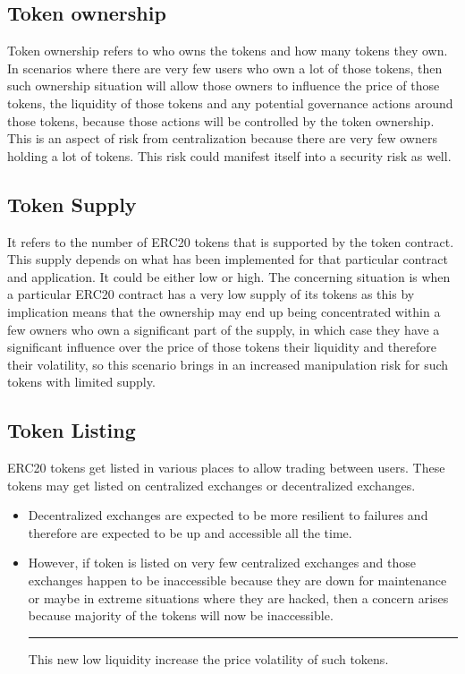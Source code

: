\subsection{Token ownership}\label{token-ownership}

Token ownership refers to who owns the tokens and how many tokens they
own. In scenarios where there are very few users who own a lot of those
tokens, then such ownership situation will allow those owners to
influence the price of those tokens, the liquidity of those tokens and
any potential governance actions around those tokens, because those
actions will be controlled by the token ownership. This is an aspect of
risk from centralization because there are very few owners holding a lot
of tokens. This risk could manifest itself into a security risk as well.

\subsection{Token Supply}\label{token-supply}

It refers to the number of ERC20 tokens that is supported by the token
contract. This supply depends on what has been implemented for that
particular contract and application. It could be either low or high. The
concerning situation is when a particular ERC20 contract has a very low
supply of its tokens as this by implication means that the ownership may
end up being concentrated within a few owners who own a significant part
of the supply, in which case they have a significant influence over the
price of those tokens their liquidity and therefore their volatility, so
this scenario brings in an increased manipulation risk for such tokens
with limited supply.

\subsection{Token Listing}\label{token-listing}

ERC20 tokens get listed in various places to allow trading between
users. These tokens may get listed on centralized exchanges or
decentralized exchanges.

\begin{itemize}
\item
  Decentralized exchanges are expected to be more resilient to failures
  and therefore are expected to be up and accessible all the time.
\item
  However, if token is listed on very few centralized exchanges and
  those exchanges happen to be inaccessible because they are down for
  maintenance or maybe in extreme situations where they are hacked, then
  a concern arises because majority of the tokens will now be
  inaccessible.

  \begin{center}\rule{0.5\linewidth}{0.5pt}\end{center}

  This new low liquidity increase the price volatility of such tokens.
\end{itemize}

